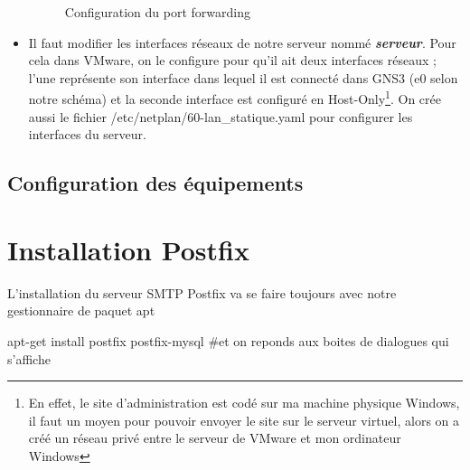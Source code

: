 \documentclass[a4paper,12pt,french]{report} %
\begin{document}
\begin{itemize}
\begin{figure}[H]
\caption{Configuration du port forwarding}
\label{Configuration du PAT}
\end{figure}
\item Il faut modifier les interfaces réseaux de notre serveur nommé \emph{\textbf{serveur}}. Pour cela dans VMware, on le configure pour qu'il ait deux interfaces réseaux ; l'une représente son interface dans lequel il est connecté dans GNS3 (e0 selon notre schéma) et la seconde interface est configuré en Host-Only\footnote{En effet, le site d'administration est codé sur ma machine physique Windows, il faut un moyen pour pouvoir envoyer le site sur le serveur virtuel, alors on a créé un réseau privé entre le serveur de VMware et mon ordinateur Windows}. On crée aussi le fichier /etc/netplan/60-lan\_statique.yaml pour configurer les interfaces du serveur.
\end{itemize}

\subsection{Configuration des équipements}

\section{Installation Postfix}
L'installation du serveur SMTP Postfix va se faire toujours avec notre gestionnaire de paquet apt
\begin{exempleConsole}
apt-get install postfix  postfix-mysql #et on reponds aux boites de dialogues qui s'affiche
\end{exempleConsole}
\end{document}
